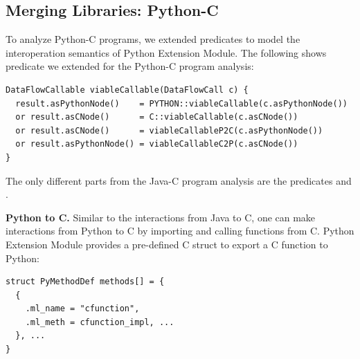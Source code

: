\subsection{Merging Libraries: Python-C}\label{sec:merging2}

To analyze Python-C programs, we extended predicates to model the
interoperation semantics of Python Extension Module.
The following shows  predicate we extended for the
Python-C program analysis: 

\begin{lstlisting}[style=codeql,xleftmargin=-.5em,numbers=none]
DataFlowCallable viableCallable(DataFlowCall c) {
  result.asPythonNode()    = PYTHON::viableCallable(c.asPythonNode())
  or result.asCNode()      = C::viableCallable(c.asCNode())
  or result.asCNode()      = viableCallableP2C(c.asPythonNode())
  or result.asPythonNode() = viableCallableC2P(c.asCNode())
}
\end{lstlisting}

\noindent
The only different parts from the Java-C program analysis are the predicates
 and .


\textbf{Python to C.} Similar to the interactions from Java to C, one can make
interactions from Python to C by importing and calling functions from
C. Python Extension Module provides a pre-defined C struct  to
export a C function to Python: 

\begin{lstlisting}[style=mcpp]
struct PyMethodDef methods[] = {
  {
    .ml_name = "cfunction",
    .ml_meth = cfunction_impl, ...
  }, ...
}
\end{lstlisting}

